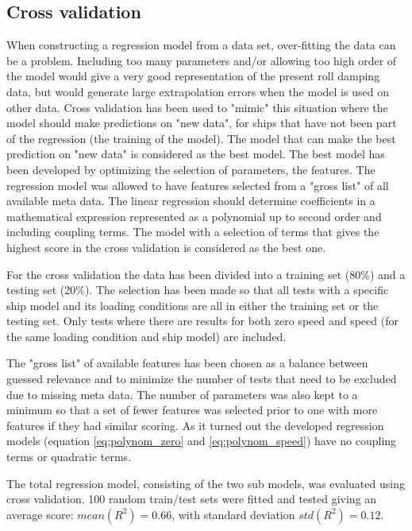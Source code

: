 


\subsection{Cross validation}
When constructing a regression model from a data set, over-fitting the data can be a problem. Including too many parameters and/or allowing too high order of the model would give a very good representation of the present roll damping data, but would generate large extrapolation errors when the model is used on other data. Cross validation has been used to "mimic" this situation where the model should make predictions on "new data", for ships that have not been part of the regression (the training of the model). The model that can make the best prediction on "new data" is considered as the best model. The best model has been developed by optimizing the selection of parameters, the features. The regression model was allowed to have features selected from a "gross list" of all available meta data. The linear regression should determine coefficients in a mathematical expression represented as a polynomial up to second order and including coupling terms. The model with a selection of terms that gives the highest score in the cross validation is considered as the best one.    

For the cross validation the data has been divided into a  training set (80\%) and a testing set (20\%). The selection has been made so that all tests with a specific ship model and its loading conditions are all in either the training set or the testing set. Only tests where there are results for both zero speed and speed (for the same loading condition and ship model) are included.

The "gross list" of available features has been chosen as a balance between guessed relevance and to minimize the number of tests that need to be excluded due to missing meta data. 
The number of parameters was also kept to a minimum so that a set of fewer features was selected prior to one with more features if they had similar scoring. As it turned out the developed regression models (equation \ref{eq:polynom_zero} and \ref{eq:polynom_speed}) have no coupling terms or quadratic terms.

The total regression model, consisting of the two sub models, was evaluated using cross validation. 100 random train/test sets were fitted and tested giving an average score: $mean(R^2)=0.66$, with standard deviation $std(R^2)=0.12$.